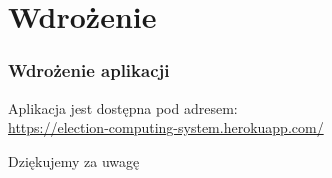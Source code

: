 \documentclass{beamer}
\begin{document}

\section{Wdrożenie}


\begin{frame}
\frametitle{Wdrożenie aplikacji}

Aplikacja jest dostępna pod adresem:\\
\url{https://election-computing-system.herokuapp.com/}

\end{frame}



\begin{frame}
\Huge{\centerline{Dziękujemy za uwagę}}
\end{frame}

\end{document}
